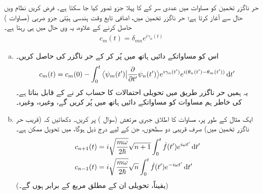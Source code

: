 حر ناگزر تخمین کو مساوات    میں عددی سر  کے    کا پہلا جزو تصور کیا جا سکتا ہے۔ فرض کریں  نظام  ویں حال سے آغاز کرتا ہے؛ حر ناگزر تخمین میں،    اضافی تابع وقت ہندسی ہیّتی جزو ضربی  (مساوات  )     حاصل کرنے کے علاوہ، یہ   وی حال میں ہی رہتا ہے۔
\begin{align*} 
c_m (t) = \delta_{mn} e^{i \gamma_n (t)}
\end{align*} 
\begin{enumerate}[a.]
\item
اس کو مساواتکے دائیں ہاتھ میں پُر کر کے حر ناگزر کی   حاصل کریں۔
\begin{align}\label{مساوات_حر_آخری_سوال}
c_m (t) = c_m (0) - \int_0^t \big\langle \psi_m (t') \big | \frac{\partial}{\partial t'} \psi_n (t') \big \rangle e^{i \gamma_n (t')} e^{i (\theta_n (t') - \theta_m (t'))} \dif t'
\end{align}
یہ  ہمیں   حر ناگزر  طریق  میں تحویلی احتمالات کا حساب کر نے کے  قابل بناتا ہے۔  کی خاطر ہم مساوات کو مساواتکے دائیں ہاتھ میں پُر کریں گے،  وغیرہ،  وغیرہ۔ 
\item
ایک مثال کے طور پر،  مساوات کا اطلاق جبری مرتعش  (سوال )   پر کریں۔  دکھائیں کہ (قریب حر ناگزر تخمین میں)  صرف قریبی دو  سطحوں، جن کے لیے درج ذیل ہوگا، میں تحویل ممکن ہے۔ 
\begin{align*}
c_{n + 1} (t)& = i \sqrt{\frac{m \omega}{2 \hslash}} \sqrt{n + 1} \int_0^t \dot{f} (t') e^{i \omega t'} \dif t' \\
c_{n - 1} (t) &= i \sqrt{\frac{m \omega}{2 \hslash}} \sqrt{n} \int_0^t \dot{f} (t') e^{-i \omega t'} \dif t'
\end{align*}
(یقیناً،  تحویلی   ان کے مطلق مربع کے برابر ہوں گے۔) 
\end{enumerate}

